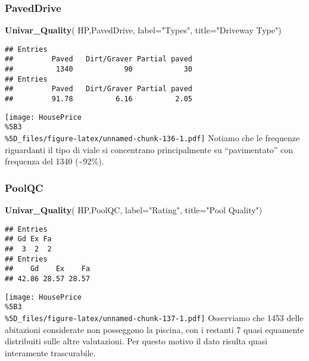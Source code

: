 \documentclass[
]{article}
\newenvironment{Shaded}{\begin{snugshade}}{\end{snugshade}}
\newcommand{\AttributeTok}[1]{\textcolor[rgb]{0.13,0.29,0.53}{#1}}
\newcommand{\FunctionTok}[1]{\textcolor[rgb]{0.13,0.29,0.53}{\textbf{#1}}}
\newcommand{\NormalTok}[1]{#1}
\newcommand{\StringTok}[1]{\textcolor[rgb]{0.31,0.60,0.02}{#1}}
\begin{document}
\subsubsection{PavedDrive}\label{paveddrive}

\begin{Shaded}
\begin{Highlighting}[]
\FunctionTok{Univar\_Quality}\NormalTok{(}
\NormalTok{  HP,PavedDrive,}
  \AttributeTok{label=}\StringTok{"Types"}\NormalTok{,}
  \AttributeTok{title=}\StringTok{"Driveway Type"}\NormalTok{)}
\end{Highlighting}
\end{Shaded}

\begin{verbatim}
## Entries
##         Paved   Dirt/Graver Partial paved 
##          1340            90            30 
## Entries
##         Paved   Dirt/Graver Partial paved 
##         91.78          6.16          2.05
\end{verbatim}

\texttt{[image: HousePrice\\\%5B3\\\%5D\_files/figure-latex/unnamed-chunk-136-1.pdf]}
Notiamo che le frequenze riguardanti il tipo di viale si concentrano
principalmente su ``pavimentato'' con frequenza del 1340
(\textasciitilde92\%).

\subsubsection{PoolQC}\label{poolqc}

\begin{Shaded}
\begin{Highlighting}[]
\FunctionTok{Univar\_Quality}\NormalTok{(}
\NormalTok{  HP,PoolQC,}
  \AttributeTok{label=}\StringTok{"Rating"}\NormalTok{,}
  \AttributeTok{title=}\StringTok{"Pool Quality"}\NormalTok{)}
\end{Highlighting}
\end{Shaded}

\begin{verbatim}
## Entries
## Gd Ex Fa 
##  3  2  2 
## Entries
##    Gd    Ex    Fa 
## 42.86 28.57 28.57
\end{verbatim}

\texttt{[image: HousePrice\\\%5B3\\\%5D\_files/figure-latex/unnamed-chunk-137-1.pdf]}
Osserviamo che 1453 delle abitazioni considerate non posseggono la
piscina, con i restanti 7 quasi equamente distribuiti sulle altre
valutazioni. Per questo motivo il dato risulta quasi interamente
trascurabile.
\end{document}
